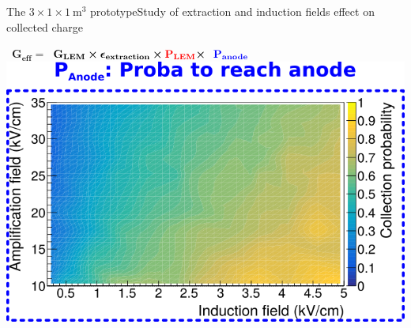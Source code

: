 \documentclass[10pt]{beamer}
\begin{document}
     \begin{frame}{The \texorpdfstring{$3 \times 1 \times \SI{1}{\meter\cubed}$}{311} prototype}{Study of extraction and induction fields effect on collected charge}
     	\begin{scriptsize}
     			\hbox{\centering
	     			\hbox{$\mathbf{G_{eff}=}$}
	     			\hbox{$\mathbf{G_{LEM}\boldsymbol{\times}\boldsymbol{\epsilon}_{extraction} \boldsymbol{\times} \textcolor{red}{P_{LEM}}\boldsymbol{\times}}$}
	     			$\mathbf{\textcolor{blue}{P_{anode}} }$
     			}\vspace{1cm}
     		\centering \includegraphics[width=.7\textwidth]{figures/311/effs_ind.png}\\
     	\end{scriptsize} 
     \end{frame}
    

    
\end{document}
